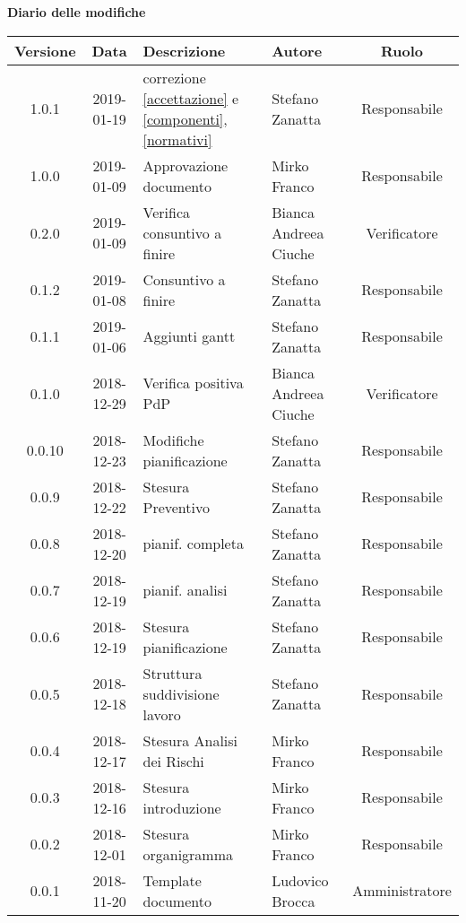 	\begin{center}
		\textbf{Diario delle modifiche}
	\end{center}
	\begin{center}
		\begin{tabularx}{\textwidth}{|c|c|X|X|c|}
			\hline
			\textbf{Versione} & \textbf{Data} & \textbf{Descrizione} & \textbf{Autore} & \textbf{Ruolo} \\
			\hline
			1.0.1 & 2019-01-19 & correzione \ref{accettazione} e \ref{componenti},\ref{normativi} & Stefano Zanatta & Responsabile\\
			\hline
			1.0.0 & 2019-01-09 & Approvazione documento & Mirko Franco & Responsabile\\
			\hline
			0.2.0 & 2019-01-09 & Verifica consuntivo a finire & Bianca Andreea Ciuche& Verificatore\\
			\hline
			0.1.2 & 2019-01-08 & Consuntivo a finire & Stefano Zanatta & Responsabile\\
			\hline
			0.1.1 & 2019-01-06 & Aggiunti gantt & Stefano Zanatta & Responsabile\\
			\hline
			0.1.0 & 2018-12-29 & Verifica positiva PdP & Bianca Andreea Ciuche& Verificatore\\
			\hline
			0.0.10 & 2018-12-23 & Modifiche pianificazione & Stefano Zanatta & Responsabile\\
			\hline
			0.0.9 & 2018-12-22 & Stesura Preventivo & Stefano Zanatta & Responsabile\\
			\hline
			0.0.8 & 2018-12-20 & pianif. completa& Stefano Zanatta & Responsabile\\
			\hline
			0.0.7 & 2018-12-19 & pianif. analisi& Stefano Zanatta & Responsabile\\
			\hline
			0.0.6 & 2018-12-19 & Stesura pianificazione & Stefano Zanatta & Responsabile\\
			\hline
			0.0.5 & 2018-12-18 & Struttura suddivisione lavoro & Stefano Zanatta & Responsabile\\
			\hline
			0.0.4 & 2018-12-17 & Stesura Analisi dei Rischi & Mirko Franco & Responsabile\\
			\hline
			0.0.3 & 2018-12-16 & Stesura introduzione &Mirko Franco& Responsabile\\
			\hline
			0.0.2 & 2018-12-01 & Stesura organigramma &Mirko Franco& Responsabile\\
			\hline
			0.0.1 & 2018-11-20 & Template documento& Ludovico Brocca & Amministratore\\			
			\hline
			
		\end{tabularx}
	\end{center}
\newpage